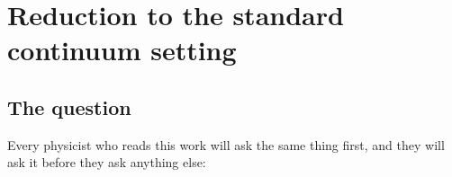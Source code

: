 
\providecommand{\spindens}{M_{0}}          %
\providecommand{\latconst}{a_{\ell}}       %
\providecommand{\softexp}{\sigma}          %
\providecommand{\Gdiagr}{G_{\mathrm{diag}}}
\providecommand{\Aeffr}{\A_{\mathrm{eff}}}

\section{Reduction to the standard continuum setting}
\label{sec:continuum-reduction}

\subsection{The question}

Every physicist who reads this work will ask the same thing first, and they will
ask it before they ask anything else:


